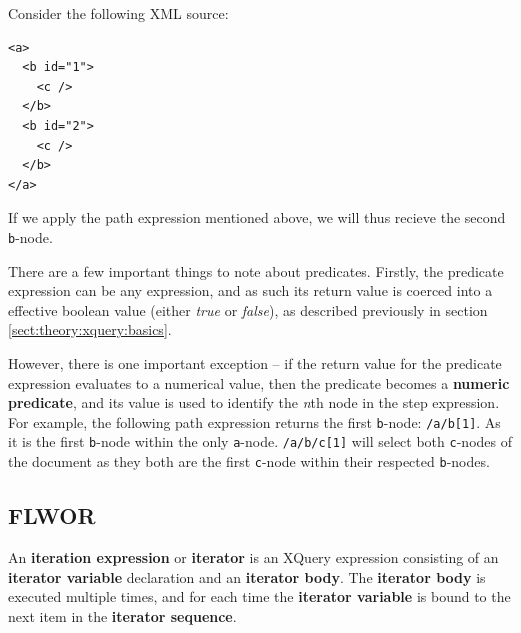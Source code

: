 Consider the following XML source:
\begin{center}
\begin{minipage}[h]{3.2cm}
\begin{verbatim}
<a>
  <b id="1">
    <c />
  </b>
  <b id="2">
    <c />
  </b>
</a>
\end{verbatim}
\end{minipage}
\end{center}
If we apply the path expression mentioned above, we will thus recieve the second
\verb!b!-node.

There are a few important things to note about predicates. Firstly, the
predicate expression can be any expression, and as such its return value is
coerced into a effective boolean value (either \textit{true} or \textit{false}), as
described previously in section \ref{sect:theory:xquery:basics}.

However, there is one important exception -- if the return value for the
predicate expression evaluates to a numerical value, then the predicate
becomes a \textbf{numeric predicate}, and its value is used to identify the
\textit{n}th node in the step expression. For example, the following path
expression returns the first \verb!b!-node: \verb!/a/b[1]!. As it is the first \verb!b!-node within the only
\verb!a!-node. \texttt{/a/b/c[1]} will select both \verb!c!-nodes of the document as they both are the first
\texttt{c}-node within their respected \texttt{b}-nodes.

\subsection{FLWOR}
\label{sect:theory:xquery:Flwor}

\begin{myDefinition}
\label{definition:iteration_expression}
An \textbf{iteration expression} or \textbf{iterator} is an XQuery expression consisting of an \textbf{iterator
variable} declaration and an \textbf{iterator body}. The \textbf{iterator body} is executed multiple times, and
for each time the \textbf{iterator variable} is bound to the next item in the \textbf{iterator sequence}.
\end{myDefinition}

